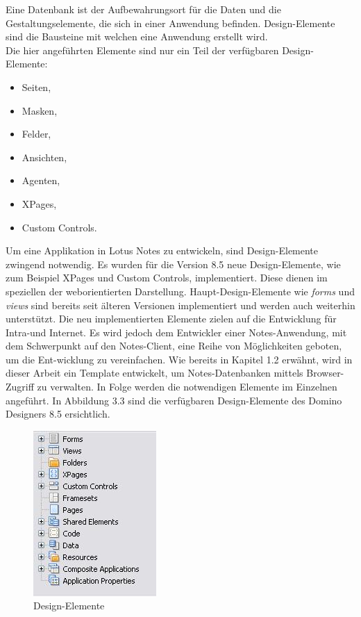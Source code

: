 Eine Datenbank ist der Aufbewahrungsort für die Daten und die Gestaltungselemente, die sich in einer Anwendung befinden. Design-Elemente sind die Bausteine
mit welchen eine \linebreak Anwendung erstellt wird.\\
\newline
Die hier angeführten Elemente sind nur ein Teil der verfügbaren Design-Elemente:
\begin{itemize}
\item Seiten,
\item Masken,
\item Felder,
\item Ansichten,
\item Agenten,
\item XPages,
\item Custom Controls. 
\end{itemize}

Um eine Applikation in Lotus Notes zu entwickeln, sind Design-Elemente zwingend notwendig. Es wurden für die Version 8.5 neue Design-Elemente, 
wie zum Beispiel XPages und Custom Controls, implementiert. Diese dienen im speziellen der weborientierten Darstellung.
Haupt-Design-Elemente wie \textit{forms} und \textit{views} sind bereits seit älteren Versionen implementiert und werden auch weiterhin unterstützt.
Die neu implementierten Elemente zielen auf die Entwicklung für Intra-und Internet. Es wird jedoch dem Entwickler einer Notes-Anwendung, mit
dem Schwerpunkt auf den Notes-Client, eine Reihe von Möglichkeiten geboten, um die Ent-\linebreak wicklung zu vereinfachen\cite{mann}.
Wie bereits in Kapitel 1.2 erwähnt, wird in dieser Arbeit ein \linebreak Template entwickelt, um Notes-Datenbanken mittels Browser-Zugriff zu verwalten.
In Folge werden die notwendigen Elemente im Einzelnen angeführt. In Abbildung 3.3 sind die \linebreak verfügbaren Design-Elemente des Domino Designers 8.5
ersichtlich.


\begin{figure}[H]
    \centerline{\includegraphics[scale=0.7]{pics/alleDesignelemente}}
    \caption[XPages Design-Elemente]{\label{FiG:XPages Design-Elemente }
	Design-Elemente }
\end{figure}

